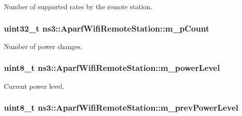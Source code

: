 Number of supported rates by the remote station. 

\subsubsection[{\texorpdfstring{m\+\_\+p\+Count}{m_pCount}}]{\setlength{\rightskip}{0pt plus 5cm}uint32\+\_\+t ns3\+::\+Aparf\+Wifi\+Remote\+Station\+::m\+\_\+p\+Count}\hypertarget{structns3_1_1AparfWifiRemoteStation_a7bc57fe2650ed9f1c6ba1607369811a3}{}\label{structns3_1_1AparfWifiRemoteStation_a7bc57fe2650ed9f1c6ba1607369811a3}


Number of power changes. 

\subsubsection[{\texorpdfstring{m\+\_\+power\+Level}{m_powerLevel}}]{\setlength{\rightskip}{0pt plus 5cm}uint8\+\_\+t ns3\+::\+Aparf\+Wifi\+Remote\+Station\+::m\+\_\+power\+Level}\hypertarget{structns3_1_1AparfWifiRemoteStation_ad424bc346252a5517f6baa4a1b8c6a27}{}\label{structns3_1_1AparfWifiRemoteStation_ad424bc346252a5517f6baa4a1b8c6a27}


Current power level. 

\subsubsection[{\texorpdfstring{m\+\_\+prev\+Power\+Level}{m_prevPowerLevel}}]{\setlength{\rightskip}{0pt plus 5cm}uint8\+\_\+t ns3\+::\+Aparf\+Wifi\+Remote\+Station\+::m\+\_\+prev\+Power\+Level}\hypertarget{structns3_1_1AparfWifiRemoteStation_ad48f6148d7bb782f649627dcbd81355a}{}\label{structns3_1_1AparfWifiRemoteStation_ad48f6148d7bb782f649627dcbd81355a}


